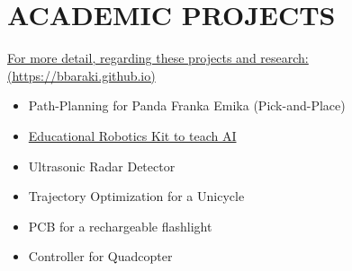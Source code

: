 \section{\textbf{ACADEMIC PROJECTS}}
\href{https://bbaraki.github.io}{For more detail, regarding these projects and research: (https://bbaraki.github.io)}
\vspace{-\baselineskip}
\begin{multicols}{2}
\begin{itemize}[noitemsep]
    \item Path-Planning for Panda Franka Emika (Pick-and-Place)
    \item \href{https://devpost.com/software/senior-design-teds-slides-update}{Educational Robotics Kit to teach AI}
    \item Ultrasonic Radar Detector
    \item Trajectory Optimization for a Unicycle
    \item PCB for a rechargeable flashlight
    \item Controller for Quadcopter
\end{itemize}
\end{multicols}
\vspace{-\baselineskip}